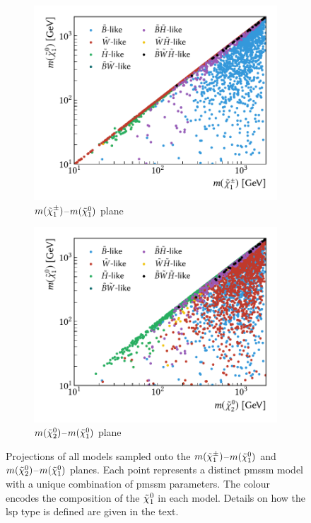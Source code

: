 \begin{figure}
	\centering
	\begin{subfigure}[b]{0.5\linewidth}
		\centering\includegraphics[width=\textwidth]{scatter/lsp_types.pdf}
		\vspace{-2.5em}
		\caption{$m(\tilde{\chi}_1^\pm)$--$m(\tilde{\chi}_1^0)$ plane\label{fig:lsp_types}}
	\end{subfigure}\hfill
	\begin{subfigure}[b]{0.5\linewidth}
		\centering\includegraphics[width=\textwidth]{scatter/lsp_types_N2.pdf}
		\vspace{-2.5em}
		\caption{$m(\tilde{\chi}_2^0)$--$m(\tilde{\chi}_1^0)$ plane\label{fig:lsp_types_N2}}
	\end{subfigure}\hfill
	\caption{Projections of all models sampled onto the  $m(\tilde{\chi}_1^\pm)$--$m(\tilde{\chi}_1^0)$ and  $m(\tilde{\chi}_2^0)$--$m(\tilde{\chi}_1^0)$ planes. Each point represents a distinct \gls{pmssm} model with a unique combination of \gls{pmssm} parameters. The colour encodes the composition of the $\tilde{\chi}_1^0$ in each model. Details on how the \gls{lsp} type is defined are given in the text.}
	\label{fig:lsp_phenomenology}
\end{figure}

